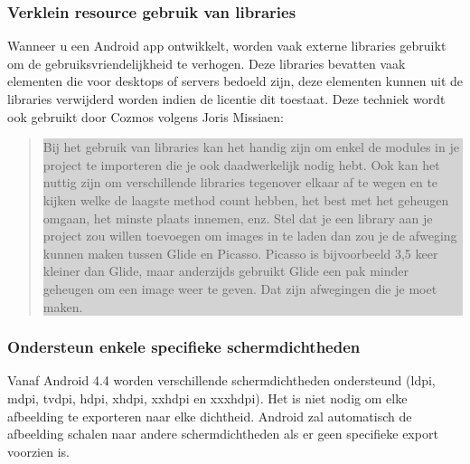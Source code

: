 \subsubsection{Verklein resource gebruik van libraries}
\label{sec:minimizeresourceslibraries}
Wanneer u een Android app ontwikkelt, worden vaak externe libraries gebruikt om de gebruiksvriendelijkheid te verhogen. Deze libraries bevatten vaak elementen die voor desktops of servers bedoeld zijn, deze elementen kunnen uit de libraries verwijderd worden indien de licentie dit toestaat. Deze techniek wordt ook gebruikt door Cozmos volgens Joris Missiaen: 
\begin{quote}
	\colorbox{lightgray}{\parbox{350px}{Bij het gebruik van libraries kan het handig zijn om enkel de modules in je project te importeren die je ook daadwerkelijk nodig hebt. Ook kan het nuttig zijn om verschillende libraries tegenover elkaar af te wegen en te kijken welke de laagste method count hebben, het best met het geheugen omgaan, het minste plaats innemen, enz. Stel dat je een library aan je project zou willen toevoegen om images in te laden dan zou je de afweging kunnen maken tussen Glide en Picasso. Picasso is bijvoorbeeld 3,5 keer kleiner dan Glide, maar anderzijds gebruikt Glide een pak minder geheugen om een image weer te geven. Dat zijn afwegingen die je moet maken.}}
\end{quote}

\subsubsection{Ondersteun enkele specifieke schermdichtheden }
\label{sec:supportspecificdensities}
Vanaf Android 4.4 worden verschillende schermdichtheden ondersteund (ldpi, mdpi, tvdpi, hdpi, xhdpi, xxhdpi en xxxhdpi). Het is niet nodig om elke afbeelding te exporteren naar elke dichtheid. Android zal automatisch de afbeelding schalen naar andere schermdichtheden als er geen specifieke export voorzien is. 

